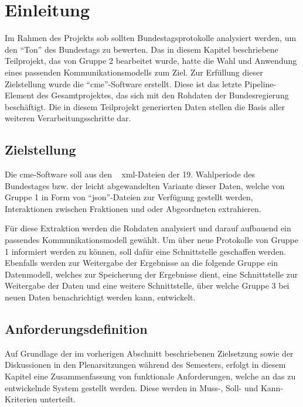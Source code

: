 \section{Einleitung}
\label{sec:03_01_einleitung}

Im Rahmen des Projekts \gls{sob} sollten Bundestagsprotokolle analysiert
werden, um den \enquote{Ton} des Bundestags zu bewerten. Das in diesem
Kapitel beschriebene Teilprojekt, das von Gruppe 2 bearbeitet wurde, hatte
die Wahl und Anwendung eines passenden Kommunikationsmodells zum Ziel. Zur
Erfüllung dieser Zielstellung wurde die \enquote{\gls{cme}}-Software erstellt.
Diese ist das letzte Pipeline-Element des Gesamtprojektes, das sich mit den Rohdaten der
Bundesregierung beschäftigt. Die in diesem Teilprojekt generierten Daten
stellen die Basis aller weiteren Verarbeitungsschritte dar.

\subsection{Zielstellung}
Die \gls{cme}-Software soll aus den ~\cite{OpenData2019}
\gls{xml}-Dateien der 19. Wahlperiode des Bundestages bzw. der leicht
abgewandelten Variante dieser Daten, welche von Gruppe 1 in Form von
\enquote{\gls{json}}-Dateien zur Verfügung gestellt werden, Interaktionen zwischen
Fraktionen und oder Abgeordneten extrahieren.

Für diese Extraktion werden die Rohdaten analysiert und darauf aufbauend ein
passendes Kommunikationsmodell gewählt. Um über neue Protokolle von Gruppe 1
informiert werden zu können, soll dafür eine Schnittstelle geschaffen werden.
Ebenfalls werden zur Weitergabe der Ergebnisse an die folgende Gruppe ein
Datenmodell, welches zur Speicherung der Ergebnisse dient, eine Schnittstelle
zur Weitergabe der Daten und eine weitere Schnittstelle, über welche Gruppe 3
bei neuen Daten benachrichtigt werden kann, entwickelt.

\subsection{Anforderungsdefinition}
\label{sec:03_requirements}

Auf Grundlage der im vorherigen Abschnitt beschriebenen Zielsetzung sowie der
Diskussionen in den Plenarsitzungen während des Semesters, erfolgt in diesem
Kapitel eine Zusammenfassung von funktionale Anforderungen, welche an das zu
entwickelnde System gestellt werden. Diese werden in Muss-, Soll- und
Kann-Kriterien unterteilt.

